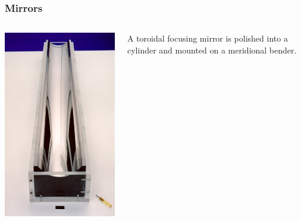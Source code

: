 \documentclass[10pt, xcolor=x11names, compress]{beamer}
\begin{document}
\begin{frame}
  \frametitle{Mirrors}
  \begin{columns}
    \begin{column}{0.5\linewidth}
      \begin{center}
        \includegraphics[width=0.7\linewidth]{bl/Toroidal.jpg}
      \end{center} 
    \end{column}
    \begin{column}{0.5\linewidth}
      A toroidal focusing mirror is polished into a cylinder and
      mounted on a meridional bender.

      \smallskip


\end{column}
\end{columns}
\end{frame}
\end{document}
